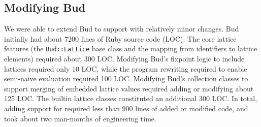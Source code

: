 \subsection{Modifying Bud}
We were able to extend Bud to support \lang with relatively minor changes. Bud
initially had about 7200 lines of Ruby source code (LOC). The core lattice
features (the \texttt{Bud::Lattice} base class and the mapping from identifiers
to lattice elements) required about 300 LOC. Modifying Bud's fixpoint logic to
include lattices required only 10 LOC, while the program rewriting required to
enable semi-naive evaluation required 100 LOC. Modifying Bud's collection
classes to support merging of embedded lattice values required adding or
modifying about 125 LOC. The builtin lattice classes constituted an additional
300 LOC. In total, adding support for \lang required less than 900 lines of
added or modified code, and took about two man-months of engineering time.%
